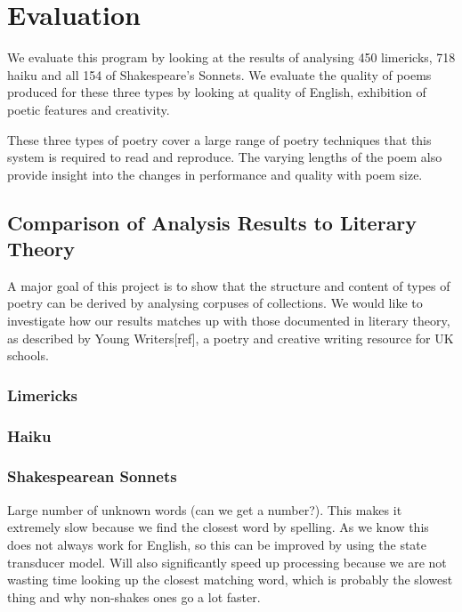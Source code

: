 \chapter{Evaluation}
\ifpdf
    \graphicspath{{Evaluation/EvaluationFigs/PNG/}{Evaluation/EvaluationFigs/PDF/}{Evaluation/EvaluationFigs/}}
\else
    \graphicspath{{Evaluation/EvaluationFigs/EPS/}{Evaluation/EvaluationFigs/}}
\fi

We evaluate this program by looking at the results of analysing 450 limericks, 718 haiku and all 154 of Shakespeare's Sonnets. We evaluate the quality of poems produced for these three types by looking at quality of English, exhibition of poetic features and creativity. 

These three types of poetry cover a large range of poetry techniques that this system is required to read and reproduce. The varying lengths of the poem also provide insight into the changes in performance and quality with poem size.

\section{Comparison of Analysis Results to Literary Theory}
A major goal of this project is to show that the structure and content of types of poetry can be derived by analysing corpuses of collections. We would like to investigate how our results matches up with those documented in literary theory, as described by Young Writers[ref], a poetry and creative writing resource for UK schools.

\subsection{Limericks}


\subsection{Haiku}

\subsection{Shakespearean Sonnets}
Large number of unknown words (can we get a number?). This makes it extremely slow because we find the closest word by spelling. As we know this does not always work for English, so this can be improved by using the state transducer model. Will also significantly speed up processing because we are not wasting time looking up the closest matching word, which is probably the slowest thing and why non-shakes ones go a lot faster.

